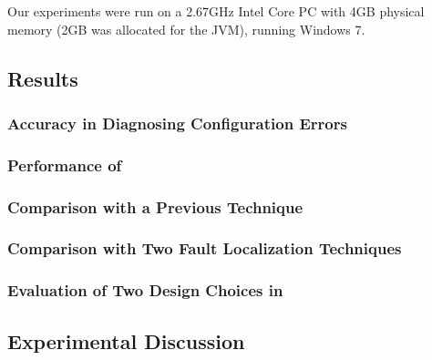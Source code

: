
Our experiments were run on a
2.67GHz Intel Core PC with 4GB physical memory (2GB was allocated
for the JVM), running Windows 7.


\vspace{-1mm}
\subsection{Results}
\label{sec:results}


\subsubsection{Accuracy in Diagnosing Configuration Errors}
\label{sec:accuracy}


\enlargethispage{5pt}

\subsubsection{Performance of \ourtool}
\label{sec:performance}


\subsubsection{Comparison with a Previous Technique}
\label{sec:confanalyzer}



\subsubsection{Comparison with Two Fault Localization Techniques}
\label{sec:comparison}




\subsubsection{Evaluation of Two Design Choices in \ourtool}
\label{sec:choices}



\vspace{-1mm}
\subsection{Experimental Discussion}
\vspace{-1mm}


